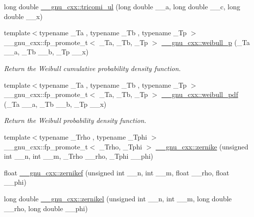 \begin{DoxyCompactItemize}
long double \hyperlink{group__mathsf__gnu_gac5213af3913aeb8beb7206688889c60c}{\+\_\+\+\_\+gnu\+\_\+cxx\+::tricomi\+\_\+ul} (long double \+\_\+\+\_\+a, long double \+\_\+\+\_\+c, long double \+\_\+\+\_\+x)
\item 
{\footnotesize template$<$typename \+\_\+\+Ta , typename \+\_\+\+Tb , typename \+\_\+\+Tp $>$ }\\\+\_\+\+\_\+gnu\+\_\+cxx\+::fp\+\_\+promote\+\_\+t$<$ \+\_\+\+Ta, \+\_\+\+Tb, \+\_\+\+Tp $>$ \hyperlink{group__mathsf__gnu_ga9afb3065fea6ef3a91126d67f726f7af}{\+\_\+\+\_\+gnu\+\_\+cxx\+::weibull\+\_\+p} (\+\_\+\+Ta \+\_\+\+\_\+a, \+\_\+\+Tb \+\_\+\+\_\+b, \+\_\+\+Tp \+\_\+\+\_\+x)
\begin{DoxyCompactList}\small\item\em Return the Weibull cumulative probability density function. \end{DoxyCompactList}\item 
{\footnotesize template$<$typename \+\_\+\+Ta , typename \+\_\+\+Tb , typename \+\_\+\+Tp $>$ }\\\+\_\+\+\_\+gnu\+\_\+cxx\+::fp\+\_\+promote\+\_\+t$<$ \+\_\+\+Ta, \+\_\+\+Tb, \+\_\+\+Tp $>$ \hyperlink{group__mathsf__gnu_gacfbb6ca9df8e0aa092ff4406baff597c}{\+\_\+\+\_\+gnu\+\_\+cxx\+::weibull\+\_\+pdf} (\+\_\+\+Ta \+\_\+\+\_\+a, \+\_\+\+Tb \+\_\+\+\_\+b, \+\_\+\+Tp \+\_\+\+\_\+x)
\begin{DoxyCompactList}\small\item\em Return the Weibull probability density function. \end{DoxyCompactList}\item 
{\footnotesize template$<$typename \+\_\+\+Trho , typename \+\_\+\+Tphi $>$ }\\\+\_\+\+\_\+gnu\+\_\+cxx\+::fp\+\_\+promote\+\_\+t$<$ \+\_\+\+Trho, \+\_\+\+Tphi $>$ \hyperlink{group__mathsf__gnu_gaaed33f29c1eb1d2c5b9590fe2e57151c}{\+\_\+\+\_\+gnu\+\_\+cxx\+::zernike} (unsigned int \+\_\+\+\_\+n, int \+\_\+\+\_\+m, \+\_\+\+Trho \+\_\+\+\_\+rho, \+\_\+\+Tphi \+\_\+\+\_\+phi)
\item 
float \hyperlink{group__mathsf__gnu_gababce1066ecef7258070b9b7fcea975f}{\+\_\+\+\_\+gnu\+\_\+cxx\+::zernikef} (unsigned int \+\_\+\+\_\+n, int \+\_\+\+\_\+m, float \+\_\+\+\_\+rho, float \+\_\+\+\_\+phi)
\item 
long double \hyperlink{group__mathsf__gnu_ga9236dd8545b448da9cb05dd8b7cf6811}{\+\_\+\+\_\+gnu\+\_\+cxx\+::zernikel} (unsigned int \+\_\+\+\_\+n, int \+\_\+\+\_\+m, long double \+\_\+\+\_\+rho, long double \+\_\+\+\_\+phi)
\end{DoxyCompactItemize}


